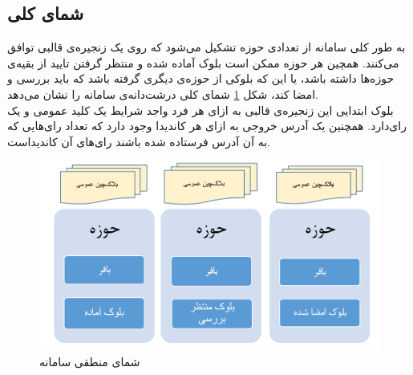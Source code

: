 \subsection{شمای کلی}
به طور کلی سامانه از تعدادی حوزه‌ تشکیل می‌شود که روی یک زنجیره‌ی قالبی توافق می‌کنند. همچین هر حوزه ممکن است بلوک‌ آماده شده و منتظر گرفتن تایید از بقیه‌ی حوزه‌ها داشته باشد، یا این که بلوکی از حوزه‌ی دیگری گرفته باشد که باید بررسی و امضا کند، شکل \ref{fig:bigpic} شمای کلی درشت‌دانه‌ی سامانه را نشان می‌دهد.
\\
بلوک ابتدایی این زنجیره‌ی قالبی به ازای هر فرد واجد شرایط یک کلید عمومی و یک رای‌دارد. همچنین یک آدرس خروجی به ازای هر کاندیدا وجود دارد که تعداد رای‌هایی که به آن آدرس فرستاده شده باشند رای‌های آن‌ کاندیداست. 
 
\begin{figure}[th]
	\centering
	\includegraphics[width=1\linewidth]{blockchain.PNG}
	\caption {شمای منطقی سامانه}
	\label{fig:bigpic}
\end{figure}

